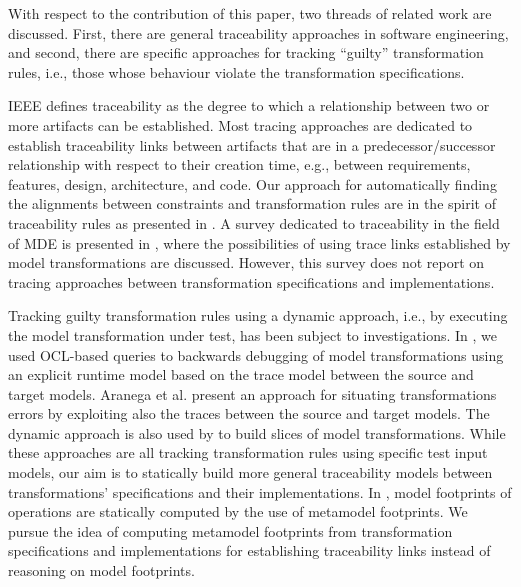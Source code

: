 With respect to the contribution of this paper, two threads of related work are discussed.
First, there are general traceability approaches in software engineering, and second, there are specific approaches for tracking ``guilty'' transformation rules, i.e., those whose behaviour violate the transformation specifications.

IEEE \cite{IEEE90} defines traceability as the degree to which a relationship between two or more artifacts can be established. Most tracing approaches are dedicated to establish traceability links between artifacts that are in a predecessor/successor relationship with respect to their creation time, e.g., between requirements, features, design, architecture, and code. Our approach for automatically finding the alignments between constraints and transformation rules are in the spirit of traceability rules as presented in \cite{RameshD92,PinheiroG96}. A survey dedicated to traceability in the field of MDE is presented in \cite{GalvaoG07}, where the possibilities of using trace links established by model transformations are discussed. However, this survey does not report on tracing approaches between transformation specifications and implementations.

Tracking guilty transformation rules using a dynamic approach, i.e., by executing the model transformation under test, has been subject to investigations. In \cite{Wimmer09}, we used OCL-based queries to backwards debugging of model transformations using an explicit runtime model based on the trace model between the source and target models. Aranega et al. \cite{AranegaMED09} present an approach for situating transformations errors by exploiting also the traces between the source and target models. The dynamic approach is also used by \cite{UjhelyiHV12} to build slices of model transformations. While these approaches are all tracking transformation rules using specific test input models, our aim is to statically build more general traceability models between transformations' specifications and their implementations. In \cite{Jeanneret11}, model footprints of operations are statically computed by the use of metamodel footprints. We pursue the idea of computing metamodel footprints from transformation specifications and implementations for establishing traceability links instead of reasoning on model footprints.
